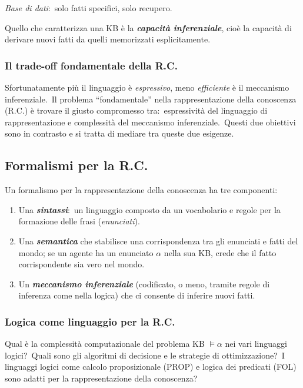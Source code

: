 \noindent\textit{Base di dati}:\ solo fatti specifici, solo recupero.\

Quello che caratterizza una KB è la \textbf{\textit{capacità inferenziale}}, cioè la capacità di derivare nuovi fatti da quelli memorizzati esplicitamente.\

\subsubsection{Il trade-off fondamentale della R.C.}
Sfortunatamente più il linguaggio è \textit{espressivo}, meno \textit{efficiente} è il meccanismo inferenziale.\
Il problema ``fondamentale'' nella rappresentazione della conoscenza (R.C.) è trovare il giusto compromesso tra:\ espressività del linguaggio di rappresentazione e complessità del meccanismo inferenziale.\
Questi due obiettivi sono in contrasto e si tratta di mediare tra queste due esigenze.

\subsection{Formalismi per la R.C.}

Un formalismo per la rappresentazione della conoscenza ha tre componenti:
\begin{enumerate}
	\item Una \textbf{\textit{sintassi}}:\ un linguaggio composto da un vocabolario e regole per la formazione delle frasi (\textit{enunciati}).
	\item Una \textbf{\textit{semantica}} che stabilisce una corrispondenza tra gli enunciati e fatti del mondo; se un agente ha un enunciato $\alpha$ nella sua KB, crede che il fatto corrispondente sia vero nel mondo.
	\item Un \textbf{\textit{meccanismo inferenziale}} (codificato, o meno, tramite regole di inferenza come nella logica) che ci consente di inferire nuovi fatti.
\end{enumerate}

\subsubsection{Logica come linguaggio per la R.C.}

Qual è la complessità computazionale del problema KB $\models \alpha$ nei vari linguaggi logici?\
Quali sono gli algoritmi di decisione e le strategie di ottimizzazione?\
I linguaggi logici come calcolo proposizionale (PROP) e logica dei predicati (FOL) sono adatti per la rappresentazione della conoscenza?

